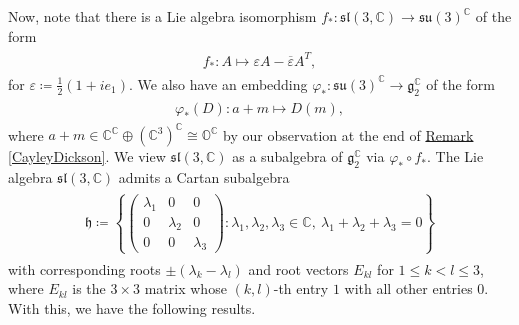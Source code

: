 \noindent Now, note that there is a Lie algebra isomorphism $f_* : \mathfrak{sl}(3, \mathbb{C}) \to \mathfrak{su}(3)^\mathbb{C}$ of the form
\begin{align*}
\begin{split}
f_* : A \mapsto \varepsilon A - \overline{\varepsilon} A^T,
\end{split}
\end{align*}
\noindent for $\varepsilon \coloneqq \frac{1}{2}(1 + ie_1)$. We also have an embedding $\varphi_* : \mathfrak{su}(3)^\mathbb{C} \to \mathfrak{g}_2^\mathbb{C}$ of the form
\begin{align*}
\begin{split}
\varphi_*(D) : a + m \mapsto D(m),
\end{split}
\end{align*}
\noindent where $a + m \in \mathbb{C}^\mathbb{C} \oplus (\mathbb{C}^3)^\mathbb{C} \cong \mathbb{O}^\mathbb{C}$ by our observation at the end of \hyperref[CayleyDickson]{Remark \ref*{CayleyDickson}}. We view $\mathfrak{sl}(3, \mathbb{C})$ as a subalgebra of $\mathfrak{g}_2^\mathbb{C}$ via $\varphi_* \circ f_*$. The Lie algebra $\mathfrak{sl}(3, \mathbb{C})$ admits a Cartan subalgebra
\begin{align*}
\begin{split}
\mathfrak{h} \coloneqq \left\{\begin{pmatrix}\lambda_1&0&0\\0&\lambda_2&0\\0&0&\lambda_3\end{pmatrix} : \lambda_1, \lambda_2, \lambda_3 \in \mathbb{C},\ \!\lambda_1 + \lambda_2 + \lambda_3 = 0\right\}
\end{split}
\end{align*}
\noindent with corresponding roots $\pm(\lambda_k - \lambda_l)$ and root vectors $E_{kl}$ for $1 \leq k < l \leq 3$, where $E_{kl}$ is the $3 \times 3$ matrix whose $(k, l)$-th entry $1$ with all other entries $0$. With this, we have the following results.\newpage

